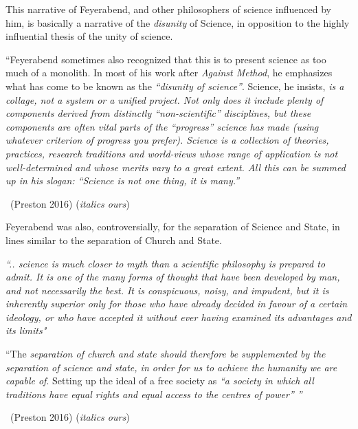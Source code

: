 \newpage

This narrative of Feyerabend, and other philosophers of science influenced by him, is basically a narrative of the \textit{disunity} of Science, in opposition to the highly influential thesis of the unity of science.

\vskip 2pt

\begin{myquote}
“Feyerabend sometimes also recognized that this is to present science as too much of a monolith. In most of his work after \textit{Against Method}, he emphasizes what has come to be known as the \textit{“disunity of science”}. Science, he insists, \textit{is a collage, not a system or a unified project. Not only does it include plenty of components derived from distinctly “non-scientific” disciplines, but these components are often vital parts of the “progress” science has made (using whatever criterion of progress you prefer). Science is a collection of theories, practices, research traditions and world-views whose range of application is not well-determined and whose merits vary to a great extent. All this can be summed up in his slogan: “Science is not one thing, it is many.”} 

~\hfill (Preston 2016) (\textit{italics ours})
\end{myquote}

\vskip 2pt

Feyerabend was also, controversially, for the separation of Science and State, in lines similar to the separation of Church and State.

\vskip 2pt

\begin{myquote}
\textit{“.. science is much closer to myth than a scientific philosophy is prepared to admit. It is one of the many forms of thought that have been developed by man, and not necessarily the best. It is conspicuous, noisy, and impudent, but it is inherently superior only for those who have already decided in favour of a certain ideology, or who have accepted it without ever having examined its advantages and its limits"}
\end{myquote}

\vskip 2pt

\begin{myquote}
“The \textit{separation of church and state should therefore be supplemented by the separation of science and state, in order for us to achieve the humanity we are capable of}. Setting up the ideal of a free society as \textit{“a society in which all traditions have equal rights and equal access to the centres of power” ”} 

~\hfill (Preston 2016) (\textit{italics ours})
\end{myquote}

